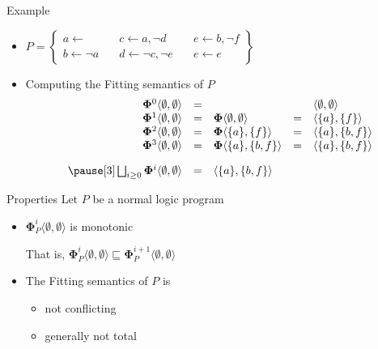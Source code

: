 \begin{frame}{Example}
  \bigskip
  \begin{itemize}
  \item<1->
    \(
    P
    =
    \left\{
      \begin{array}{lll}
        a \leftarrow                \quad &
        c \leftarrow a, \neg d      \quad &
        e \leftarrow b, \neg f
        \\
        b \leftarrow \neg a         \quad &
        d \leftarrow \neg c, \neg e \quad &
        e \leftarrow e
      \end{array}
    \right\}
    \)
  \bigskip
  \item<2-> Computing the Fitting semantics of $P$
    \[
    \begin{array}{rclcl}
      \mathbf{\Phi}^0\langle\emptyset,\emptyset\rangle&=&                                              & &\langle\emptyset,\emptyset\rangle
      \\
      \mathbf{\Phi}^1\langle\emptyset,\emptyset\rangle&=&\mathbf{\Phi}\langle\emptyset,\emptyset\rangle&=&\langle\{a\}    ,\{f\}    \rangle
      \\
      \mathbf{\Phi}^2\langle\emptyset,\emptyset\rangle&=&\mathbf{\Phi}\langle\{a\}    ,\{f\}    \rangle&=&\langle\{a\}    ,\{b,f\}  \rangle
      \\
      \mathbf{\Phi}^3\langle\emptyset,\emptyset\rangle&=&\mathbf{\Phi}\langle\{a\}    ,\{b,f\}  \rangle&=&\langle\{a\}    ,\{b,f\}  \rangle%
      \\[10pt]\pause[3]
      \bigsqcup_{i \geq 0}\mathbf{\Phi}^i\langle\emptyset,\emptyset\rangle&=&\langle \{a\}, \{b,f\} \rangle
    \end{array}
    \]
  \end{itemize}
\end{frame}
\begin{frame}{Properties}
  \bigskip
  Let $P$ be a normal logic program
  \medskip
  \begin{itemize}
  \item ${\mathbf{\Phi}}_P^i\langle \emptyset, \emptyset \rangle$ is monotonic
    \smallskip

    That is,
    \(
    {\mathbf{\Phi}}_P^i\langle \emptyset, \emptyset \rangle
    \sqsubseteq
    {\mathbf{\Phi}}_P^{i+1}\langle \emptyset, \emptyset \rangle
    \)
    \medskip
  \item The Fitting semantics of $P$ is
    \begin{itemize}\normalsize
    \item not conflicting
    \item generally not total
    \end{itemize}
  \end{itemize}
\end{frame}
